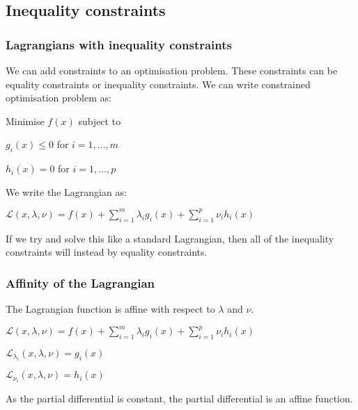 
\subsection{Inequality constraints}

\subsubsection{Lagrangians with inequality constraints}

We can add constraints to an optimisation problem. These constraints can be equality constraints or inequality constraints. We can write constrained optimisation problem as:

Minimise \(f(x)\) subject to 

\(g_i(x)\le 0\) for \(i=1,…,m\)

\(h_i(x)=0\) for \(i=1,…,p\)

We write the Lagrangian as:

\(\mathcal{L}(x, \lambda, \nu )=f(x)+\sum_{i=1}^m\lambda_i g_i(x)+\sum_{i=1}^p\nu_ih_i(x)\)

If we try and solve this like a standard Lagrangian, then all of the inequality constraints will instead by equality constraints.

\subsubsection{Affinity of the Lagrangian}

The Lagrangian function is affine with respect to \(\lambda \) and \(\nu \).

\(\mathcal{L}(x, \lambda, \nu )=f(x)+\sum_{i=1}^m\lambda_i g_i(x)+\sum_{i=1}^p\nu_ih_i(x)\)

\(\mathcal{L}_{\lambda_i}(x, \lambda, \nu )=g_i(x)\)

\(\mathcal{L}_{\nu_i}(x, \lambda, \nu )=h_i(x)\)

As the partial differential is constant, the partial differential is an affine function.

